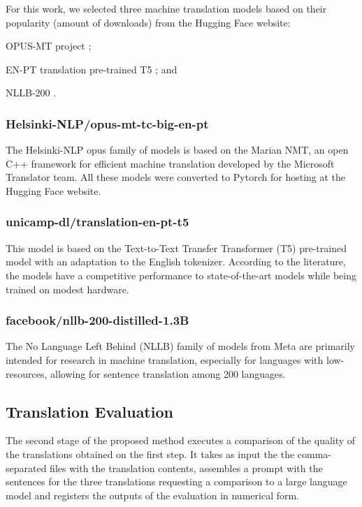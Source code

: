 \documentclass[runningheads]{llncs}
\begin{document}
For this work, we selected three machine translation models based on their popularity (amount of downloads) from the Hugging Face website:
\begin{enumerate*}
    \item OPUS-MT project \cite{tiedemann2020opus};
    \item EN-PT translation pre-trained T5 \cite{lopes2020lite}; and
    \item NLLB-200 \cite{costa2022no}.
\end{enumerate*}

\subsubsection{Helsinki-NLP/opus-mt-tc-big-en-pt}

The Helsinki-NLP opus family of models is based on the Marian NMT, an open C++ framework for efficient machine translation developed by the Microsoft Translator team. All these models were converted to Pytorch for hosting at the Hugging Face website.

\subsubsection{unicamp-dl/translation-en-pt-t5}

This model is based on the Text-to-Text Transfer Transformer (T5) pre-trained model with an adaptation to the English tokenizer. According to the literature, the models have a competitive performance to state-of-the-art models while being trained
on modest hardware.

\subsubsection{facebook/nllb-200-distilled-1.3B}

The No Language Left Behind (NLLB) family of models from Meta are primarily intended for research in machine translation, especially for languages with low-resources, allowing for sentence translation among 200 languages.

\subsection{Translation Evaluation}
\label{subsec:translation-evaluation}

The second stage of the proposed method executes a comparison of the quality of the translations obtained on the first step. It takes as input the the comma-separated files with the translation contents, assembles a prompt with the sentences for the three translations requesting a comparison to a large language model and registers the outputs of the evaluation in numerical form. 
\end{document}
